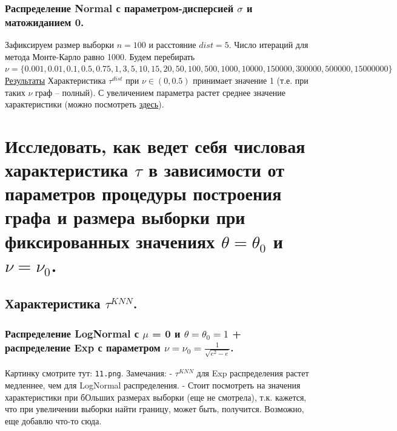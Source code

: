 \documentclass{report}
\begin{document}
\subsection{Распределение Normal с параметром-дисперсией $\sigma$ и матожиданием 0.}
Зафиксируем размер выборки $n = 100$ и расстояние $dist = 5$. Число итераций для метода Монте-Карло равно 1000.
\newline
\newline
Будем перебирать \\
$\nu = \{0.001, 0.01, 0.1, 0.5, 0.75, 1, 3, 5, 10, 15, 20, 50, 100, 500, 1000, 10000, 150000, 300000, 500000, 15000000\}$
\newline
\newline
\href{https://github.com/misshimichka/dm-random-graphs/blob/dmitrii/report/report/fix_construct_norm_mis_dist.png}{Результаты}
\newline
\newline
Характеристика $\tau^{dist}$ при $\nu \in (0, 0.5)$ принимает значение 1 (т.е. при таких $\nu$ граф -- полный). С увеличением параметра растет среднее значение характеристики (можно посмотреть \href{https://github.com/misshimichka/dm-random-graphs/blob/dmitrii/report/report/fix_construct_norm_sigma2avg_mis_dist.png}{здесь}).

\chapter{Исследовать, как ведет себя числовая характеристика $\tau$ в зависимости от параметров процедуры построения графа и размера выборки при фиксированных значениях $\theta = \theta_0$ и $\nu = \nu_0$.}
\section{Характеристика $\tau^{KNN}$.}
\subsection{Распределение LogNormal с $\mu$ = 0 и $\theta = \theta_0 = 1$ + распределение Exp с параметром $\nu = \nu_0 = \frac{1}{\sqrt{e^2 - e}}$.}
Картинку смотрите тут: \texttt{11.png}.
\newline
\newline
Замечания:
\newline
\newline
- $\tau^{KNN}$ для Exp распределения растет медленнее, чем для LogNormal распределения.
\newline
\newline
- Стоит посмотреть на значения характеристики при бОльших размерах выборки (еще не смотрела), т.к. кажется, что при увеличении выборки найти границу, может быть, получится.
\newline
\newline
Возможно, еще добавлю что-то сюда.
\end{document}
